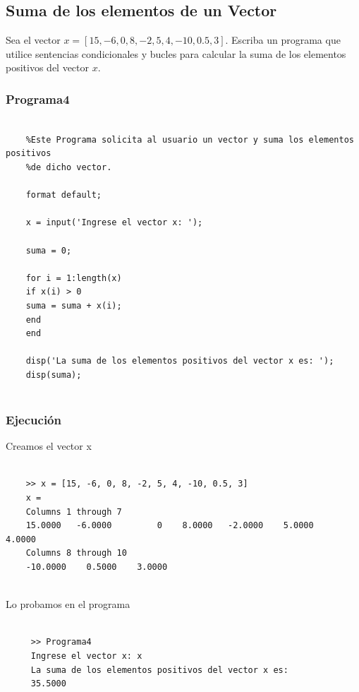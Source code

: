 \documentclass{article}
\begin{document}
	\subsection{Suma de los elementos de un Vector}
	
	Sea el vector $x = [15, -6, 0, 8, -2, 5, 4, -10, 0.5, 3]$. Escriba un programa que utilice sentencias condicionales y bucles para calcular la suma de los elementos positivos del vector $x$.
	
	\subsubsection{Programa4}
	
	\begin{lstlisting}
	
	%Este Programa solicita al usuario un vector y suma los elementos positivos
	%de dicho vector.
	
	format default;
	
	x = input('Ingrese el vector x: ');
	
	suma = 0;
	
	for i = 1:length(x)
	if x(i) > 0
	suma = suma + x(i);
	end
	end
	
	disp('La suma de los elementos positivos del vector x es: ');
	disp(suma);
	
	\end{lstlisting}
	
	\subsubsection{Ejecución}
	
	Creamos el vector x
	\\
	
	\begin{lstlisting}
	
	>> x = [15, -6, 0, 8, -2, 5, 4, -10, 0.5, 3]
	x =
	Columns 1 through 7
	15.0000   -6.0000         0    8.0000   -2.0000    5.0000    4.0000
	Columns 8 through 10
	-10.0000    0.5000    3.0000
	
	\end{lstlisting}
	 
	 Lo probamos en el programa
	 \\
	 
	 \begin{lstlisting}
	 
	 >> Programa4
	 Ingrese el vector x: x
	 La suma de los elementos positivos del vector x es: 
	 35.5000
	 
	 \end{lstlisting}
	 \newpage
	 
\end{document}
